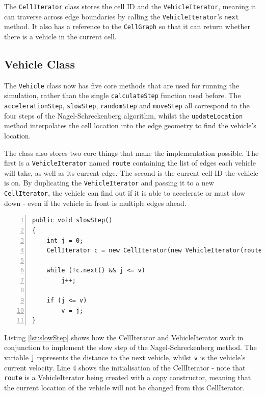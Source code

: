 \documentclass[ %
                    author={Alexander Hill},
                supervisor={Dr. Benjamin Sach},
                    degree={MEng},
                     title={MARMOSET},
                  subtitle={Multi-Agent Route Management using Online Simulation for Efficient Transportation},
                      type={research},
                      year={2016} ]{dissertation}
\begin{document}
The \texttt{CellIterator} class stores the cell ID and the
\texttt{VehicleIterator}, meaning it can traverse across edge boundaries by
calling the \texttt{VehicleIterator}'s \texttt{next} method. It also has a
reference to the \texttt{CellGraph} so that it can return whether there is a
vehicle in the current cell.

\subsection{Vehicle Class}

The \texttt{Vehicle} class now has five core methods that are used for running the
simulation, rather than the single \texttt{calculateStep} function used before.
The \texttt{accelerationStep}, \texttt{slowStep}, \texttt{randomStep} and
\texttt{moveStep} all correspond to the four steps of the Nagel-Schreckenberg
algorithm, whilst the \texttt{updateLocation} method interpolates the cell
location into the edge geometry to find the vehicle's location.

The class also stores two core things that make the implementation possible.
The first is a \texttt{VehicleIterator} named \texttt{route} containing the
list of edges each vehicle will take, as well as its current edge. The second is
the current cell ID the vehicle is on. By duplicating the
\texttt{VehicleIterator} and passing it to a new \texttt{CellIterator}, the
vehicle can find out if it is able to accelerate or must slow down - even if the
vehicle in front is multiple edges ahead.

\begin{minipage}{\linewidth}
\begin{lstlisting}[caption={The \texttt{slowStep} implementation making use of the CellIterator},
                    label=lst:slowStep, numbers=left]
public void slowStep()
{
    int j = 0;
    CellIterator c = new CellIterator(new VehicleIterator(route), cg, cellId);

    while (!c.next() && j <= v)
        j++;

    if (j <= v)
        v = j;
}
\end{lstlisting}
\end{minipage}

Listing \ref{lst:slowStep} shows how the CellIterator and VehicleIterator work
in conjunction to implement the slow step of the Nagel-Schreckenberg method.
The variable \texttt{j} represents the distance to the next vehicle, whilst
\texttt{v} is the vehicle's current velocity. Line 4 shows the initialisation of
the CellIterator - note that \texttt{route} is a VehicleIterator being created
with a copy constructor, meaning that the current location of the vehicle will
not be changed from this CellIterator.
\end{document}
